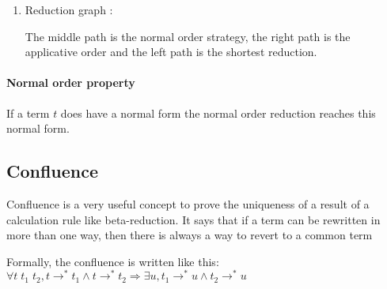 \begin{enumerate}
    \item Reduction graph :
      \begin{center}
      \end{center}

      The middle path is the normal order strategy, the right path is the
      applicative order and the left path is the shortest reduction.
  \end{enumerate}

  \paragraph{Normal order property} If a term $t$ does have a normal form the
  normal order reduction reaches this normal form.

  \subsection{Confluence}

  Confluence is a very useful concept to prove the uniqueness of a result of
  a calculation rule like beta-reduction. It says that if a term can be
  rewritten in more than one way, then there is always a way to revert to a
  common term

  Formally, the confluence is written
  like this: $\forall t\; t_1\; t_2, t \to^* t_1 \wedge t \to^* t_2 \Rightarrow
  \exists u, t_1 \to^* u \wedge t_2 \to^* u$

